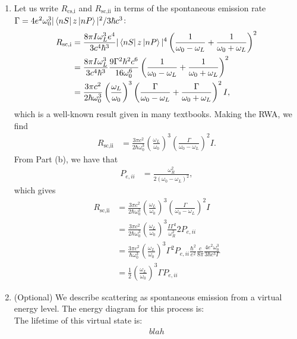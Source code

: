 \documentclass{article}
\theoremstyle{definition}
\newcommand{\f}[2]{\frac{#1}{#2}}
\newcommand{\lp}{\left(}
\newcommand{\rp}{\right)}
\begin{document}
\begin{enumerate}[label=(\alph*)]
\begin{enumerate}[label=(\roman*)]
		\item Let us write $R_\text{cs,i}$ and $R_\text{sc,ii}$ in terms of the spontaneous emission rate $\Gamma = 4e^2 \omega_0^3 |\bra{nS}z\ket{nP}|^2/3\hbar c^3$: 
		\begin{align*}
			R_\text{sc,i} &= \f{8\pi I\omega_L^3 e^4}{3 c^4 \hbar^3} |\bra{nS} z \ket{nP}|^4 \lp \f{1}{\omega_0 - \omega_L} + \f{1}{\omega_0 + \omega_L} \rp^2 \\
			&= \f{8\pi I\omega_L^3 }{3 c^4 \hbar^3} \f{9\Gamma^2 \hbar^2 c^6}{16\omega_0^6}  \lp \f{1}{\omega_0 - \omega_L} + \f{1}{\omega_0 + \omega_L} \rp^2\\
			&= \f{3\pi c^2}{2\hbar \omega_0^3}\lp \f{\omega_L}{\omega_0} \rp^3 \lp \f{\Gamma}{\omega_0 - \omega_L} + \f{\Gamma}{\omega_0 + \omega_L} \rp^2 I,
		\end{align*}
	which is a well-known result given in many textbooks. Making the RWA, we find
	\begin{align*}
		R_\text{sc,ii} &= \f{3\pi c^2}{2\hbar \omega_0^3}\lp \f{\omega_L}{\omega_0} \rp^3 \lp \f{\Gamma}{\omega_0 - \omega_L}  \rp^2 I.
	\end{align*}
	From Part (b), we have that
	\begin{align*}
		P_{e,ii} &= \f{\omega_R^2}{2(\omega_0 - \omega_L)^2},
	\end{align*}
	which gives
	\begin{align*}
		R_\text{sc,ii} &=  \f{3\pi c^2}{2\hbar \omega_0^3}\lp \f{\omega_L}{\omega_0} \rp^3 \lp \f{\Gamma}{\omega_0 - \omega_L}  \rp^2 I \\
		&= \f{3\pi c^2}{2\hbar \omega_0^3}\lp \f{\omega_L}{\omega_0} \rp^3 \f{I\Gamma^2 }{\omega_R^2} 2P_{e,ii}\\
		&= \f{3\pi c^2}{\hbar \omega_0^3}\lp \f{\omega_L}{\omega_0} \rp^3 \Gamma^2 P_{e,ii} \f{\hbar^2}{e^2}\f{c}{8\pi} \f{4e^2\omega_0^3}{3\hbar c^3 \Gamma}\\
		&= \boxed{\f{ 1}{2}\lp \f{\omega_L}{\omega_0} \rp^3 \Gamma P_{e,ii}}
	\end{align*}
	
	
	
	
		\item (Optional) We describe scattering as spontaneous emission from a virtual energy level. The energy diagram for this process is:\\
		
		
		The lifetime of this virtual state is:
		\begin{align*}
			blah
		\end{align*}
	\end{enumerate}
	

\end{enumerate}
\end{document}
